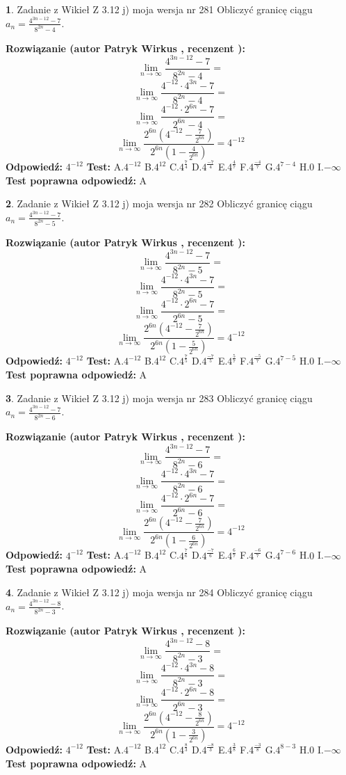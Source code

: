 \documentclass[12pt, a4paper]{article}
\theoremstyle{definition} %
\newtheorem{zad}{}
\newcommand{\zadStart}[1]{\begin{zad}#1\newline}
\newcommand{\zadStop}{\end{zad}}
\newcommand{\rozwStart}[2]{\noindent \textbf{Rozwiązanie (autor #1 , recenzent #2): }\newline}
\newcommand{\rozwStop}{\newline}
\newcommand{\odpStart}{\noindent \textbf{Odpowiedź:}\newline}
\newcommand{\odpStop}{\newline}
\newcommand{\testStart}{\noindent \textbf{Test:}\newline}
\newcommand{\testStop}{\newline}
\newcommand{\kluczStart}{\noindent \textbf{Test poprawna odpowiedź:}\newline}
\newcommand{\kluczStop}{\newline}
\begin{document}
\zadStart{Zadanie z Wikieł Z 3.12 j) moja wersja nr 281}
Obliczyć granicę ciągu $a_{n}=\frac{4^{3n-12}-7}{8^{2n}-4}$.
\zadStop
\rozwStart{Patryk Wirkus}{}
$$\lim\limits_{n\to\infty}\frac{4^{3n-12}-7}{8^{2n}-4}=$$
$$\lim\limits_{n\to\infty}\frac{4^{-12} \cdot 4^{3n}-7}{8^{2n}-4}=$$
$$\lim\limits_{n\to\infty}\frac{4^{-12} \cdot 2^{6n}-7}{2^{6n}-4}=$$
$$\lim\limits_{n\to\infty}\frac{2^{6n}(4^{-12} - \frac{7}{2^{6n}})}{2^{6n}(1-\frac{4}{2^{6n}})}= 4^{-12}$$
\rozwStop
\odpStart
$4^{-12}$
\odpStop
\testStart
A.$4^{-12}$
B.$4^{12}$
C.$4^{\frac{7}{4}}$
D.$4^{\frac{-7}{4}}$
E.$4^{\frac{4}{7}}$
F.$4^{\frac{-4}{7}}$
G.$4^{7-4}$
H.$0$
I.$-\infty$
\testStop
\kluczStart
A
\kluczStop



\zadStart{Zadanie z Wikieł Z 3.12 j) moja wersja nr 282}
Obliczyć granicę ciągu $a_{n}=\frac{4^{3n-12}-7}{8^{2n}-5}$.
\zadStop
\rozwStart{Patryk Wirkus}{}
$$\lim\limits_{n\to\infty}\frac{4^{3n-12}-7}{8^{2n}-5}=$$
$$\lim\limits_{n\to\infty}\frac{4^{-12} \cdot 4^{3n}-7}{8^{2n}-5}=$$
$$\lim\limits_{n\to\infty}\frac{4^{-12} \cdot 2^{6n}-7}{2^{6n}-5}=$$
$$\lim\limits_{n\to\infty}\frac{2^{6n}(4^{-12} - \frac{7}{2^{6n}})}{2^{6n}(1-\frac{5}{2^{6n}})}= 4^{-12}$$
\rozwStop
\odpStart
$4^{-12}$
\odpStop
\testStart
A.$4^{-12}$
B.$4^{12}$
C.$4^{\frac{7}{5}}$
D.$4^{\frac{-7}{5}}$
E.$4^{\frac{5}{7}}$
F.$4^{\frac{-5}{7}}$
G.$4^{7-5}$
H.$0$
I.$-\infty$
\testStop
\kluczStart
A
\kluczStop



\zadStart{Zadanie z Wikieł Z 3.12 j) moja wersja nr 283}
Obliczyć granicę ciągu $a_{n}=\frac{4^{3n-12}-7}{8^{2n}-6}$.
\zadStop
\rozwStart{Patryk Wirkus}{}
$$\lim\limits_{n\to\infty}\frac{4^{3n-12}-7}{8^{2n}-6}=$$
$$\lim\limits_{n\to\infty}\frac{4^{-12} \cdot 4^{3n}-7}{8^{2n}-6}=$$
$$\lim\limits_{n\to\infty}\frac{4^{-12} \cdot 2^{6n}-7}{2^{6n}-6}=$$
$$\lim\limits_{n\to\infty}\frac{2^{6n}(4^{-12} - \frac{7}{2^{6n}})}{2^{6n}(1-\frac{6}{2^{6n}})}= 4^{-12}$$
\rozwStop
\odpStart
$4^{-12}$
\odpStop
\testStart
A.$4^{-12}$
B.$4^{12}$
C.$4^{\frac{7}{6}}$
D.$4^{\frac{-7}{6}}$
E.$4^{\frac{6}{7}}$
F.$4^{\frac{-6}{7}}$
G.$4^{7-6}$
H.$0$
I.$-\infty$
\testStop
\kluczStart
A
\kluczStop



\zadStart{Zadanie z Wikieł Z 3.12 j) moja wersja nr 284}
Obliczyć granicę ciągu $a_{n}=\frac{4^{3n-12}-8}{8^{2n}-3}$.
\zadStop
\rozwStart{Patryk Wirkus}{}
$$\lim\limits_{n\to\infty}\frac{4^{3n-12}-8}{8^{2n}-3}=$$
$$\lim\limits_{n\to\infty}\frac{4^{-12} \cdot 4^{3n}-8}{8^{2n}-3}=$$
$$\lim\limits_{n\to\infty}\frac{4^{-12} \cdot 2^{6n}-8}{2^{6n}-3}=$$
$$\lim\limits_{n\to\infty}\frac{2^{6n}(4^{-12} - \frac{8}{2^{6n}})}{2^{6n}(1-\frac{3}{2^{6n}})}= 4^{-12}$$
\rozwStop
\odpStart
$4^{-12}$
\odpStop
\testStart
A.$4^{-12}$
B.$4^{12}$
C.$4^{\frac{8}{3}}$
D.$4^{\frac{-8}{3}}$
E.$4^{\frac{3}{8}}$
F.$4^{\frac{-3}{8}}$
G.$4^{8-3}$
H.$0$
I.$-\infty$
\testStop
\kluczStart
A
\kluczStop
\end{document}
